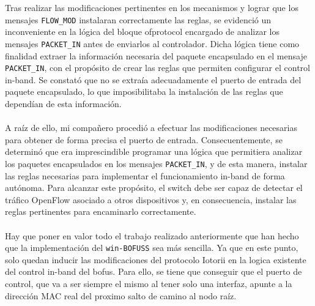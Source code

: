 Tras realizar las modificaciones pertinentes en los mecanismos y lograr que los mensajes \texttt{FLOW\_MOD} instalaran correctamente las reglas, se evidenció un inconveniente en la lógica del bloque ofprotocol encargado de analizar los mensajes \texttt{PACKET\_IN} antes de enviarlos al controlador. Dicha lógica tiene como finalidad extraer la información necesaria del paquete encapsulado en el mensaje \texttt{PACKET\_IN}, con el propósito de crear las reglas que permiten configurar el control in-band. Se constató que no se extraía adecuadamente el puerto de entrada del paquete encapsulado, lo que imposibilitaba la instalación de las reglas que dependían de esta información.\\
\\
A raíz de ello, mi compañero procedió a efectuar las modificaciones necesarias para obtener de forma precisa el puerto de entrada. Consecuentemente, se determinó que era imprescindible programar una lógica que permitiera analizar los paquetes encapsulados en los mensajes \texttt{PACKET\_IN}, y de esta manera, instalar las reglas necesarias para implementar el funcionamiento in-band de forma autónoma. Para alcanzar este propósito, el switch debe ser capaz de detectar el tráfico OpenFlow asociado a otros dispositivos y, en consecuencia, instalar las reglas pertinentes para encaminarlo correctamente. \\
\\
Hay que poner en valor todo el trabajo realizado anteriormente que han hecho que la implementación del \texttt{win-BOFUSS} sea más sencilla. Ya que en este punto, solo quedan inducir las modificaciones del protocolo Iotorii en la logica existente del control in-band del \gls{bofus}. Para ello, se tiene que conseguir que el puerto de control, que va a ser siempre el mismo al tener solo una interfaz, apunte a la dirección MAC real del proximo salto de camino al nodo raíz.

\newpage

